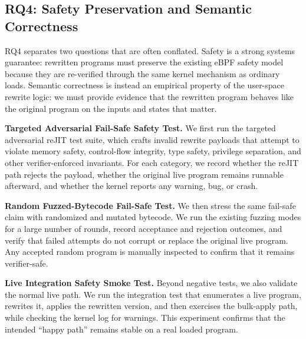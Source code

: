 \subsection{RQ4: Safety Preservation and Semantic Correctness}
\label{subsec:rq4}

RQ4 separates two questions that are often conflated. Safety is a strong systems guarantee: rewritten programs must preserve the existing eBPF safety model because they are re-verified through the same kernel mechanism as ordinary loads. Semantic correctness is instead an empirical property of the user-space rewrite logic: we must provide evidence that the rewritten program behaves like the original program on the inputs and states that matter.

\noindent\textbf{Targeted Adversarial Fail-Safe Safety Test.}
We first run the targeted adversarial reJIT test suite, which crafts invalid rewrite payloads that attempt to violate memory safety, control-flow integrity, type safety, privilege separation, and other verifier-enforced invariants. For each category, we record whether the reJIT path rejects the payload, whether the original live program remains runnable afterward, and whether the kernel reports any warning, bug, or crash.


\noindent\textbf{Random Fuzzed-Bytecode Fail-Safe Test.}
We then stress the same fail-safe claim with randomized and mutated bytecode. We run the existing fuzzing modes for a large number of rounds, record acceptance and rejection outcomes, and verify that failed attempts do not corrupt or replace the original live program. Any accepted random program is manually inspected to confirm that it remains verifier-safe.


\noindent\textbf{Live Integration Safety Smoke Test.}
Beyond negative tests, we also validate the normal live path. We run the integration test that enumerates a live program, rewrites it, applies the rewritten version, and then exercises the bulk-apply path, while checking the kernel log for warnings. This experiment confirms that the intended ``happy path'' remains stable on a real loaded program.

